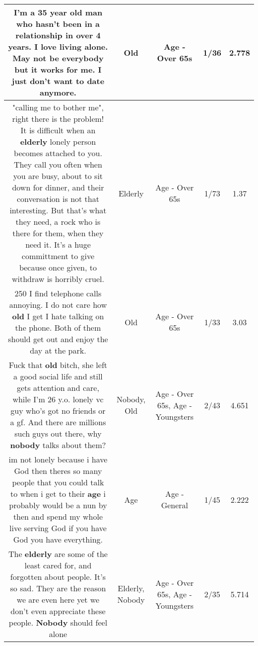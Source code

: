 \documentclass[11pt]{article}
\newlength\mylength
\begin{document}
\begin{center}
\begin{longtable}{|C{.65\mylength}|C{.30\mylength}|C{.12\mylength}|C{.12\mylength}|C{.12\mylength}|}
  \small I'm a 35 year \textbf{old} man who hasn't been in a relationship in over 4 years. I love living alone. May not be everybody but it works for me. I just don't want to date anymore.\normalsize   & Old & Age - Over 65s & 1/36 & 2.778 \\  \hline
  \small "calling me to bother me", right there is the problem! It is difficult when an \textbf{elderly} lonely person becomes attached to you. They call you often when you are busy, about to sit down for dinner, and their conversation is not that interesting. But that's what they need, a rock who is there for them, when they need it. It's a huge committment to give because once given, to withdraw is horribly cruel.\normalsize   & Elderly & Age - Over 65s & 1/73 & 1.37 \\  \hline
  \small 250 I find telephone calls annoying.   I do not care how \textbf{old} I get I hate talking on the phone.    Both of them should get out and enjoy the day at the park.\normalsize   & Old & Age - Over 65s & 1/33 & 3.03 \\  \hline
  \small Fuck that \textbf{old} bitch, she left a good social life and still gets attention and care, while I'm 26 y.o. lonely vc guy who's got no friends or a gf. And there are millions such guys out there, why \textbf{nobody} talks about them?\normalsize   & Nobody, Old & Age - Over 65s, Age - Youngsters & 2/43 & 4.651 \\  \hline
  \small im not lonely because i have God then theres so many people that you could talk to when i get to their \textbf{age} i probably would be a nun by then and spend my whole live serving God if you have God you have everything.\normalsize   & Age & Age - General & 1/45 & 2.222 \\  \hline
  \small The \textbf{elderly} are some of the least cared for, and forgotten about people. It's so sad. They are the reason we are even here yet we don't even appreciate these people. \textbf{Nobody} should feel alone\normalsize   & Elderly, Nobody & Age - Over 65s, Age - Youngsters & 2/35 & 5.714 \\  \hline

\end{longtable}
\end{center}
\end{document}
